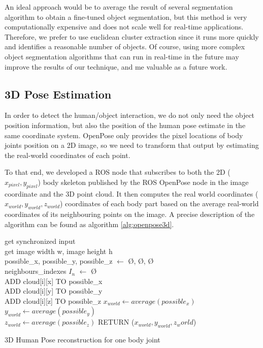 An ideal approach would be to average the result of several segmentation algorithm to obtain a fine-tuned object segmentation, but this method is very computationally expensive and does not scale well for real-time applications. Therefore, we prefer to use euclidean cluster extraction since it runs more quickly and identifies a reasonable number of objects. Of course, using more complex object segmentation algorithms that can run in real-time in the future may improve the results of our technique, and me valuable as a future work.

\subsection{3D Pose Estimation}
In order to detect the human/object interaction, we do not only need the object position information, but also the position of the human pose estimate in the same coordinate system. OpenPose only provides the pixel locations of body joints position on a 2D image, so we need to transform that output by estimating the real-world coordinates of each point.

To that end, we developed a ROS node that subscribes to both the 2D ($x_{pixel}, y_{pixel}$) body skeleton published by the ROS OpenPose node in the image coordinate and the 3D point cloud. It then computes the real world coordinates ($x_{world}, y_{world}, z_{world}$) coordinates of each body part based on the average real-world coordinates of its neighbouring points on the image. A precise description of the algorithm can be found as algorithm \ref{alg:openpose3d}.

\begin{algorithm}[htp]
    get synchronized input \\
    get image width w, image height h \\
    possible\_x, possible\_y, possible\_z $\leftarrow$ \O, \O, \O \\
    neighbours\_indexes $I_n$ $\leftarrow$ \O \\
    {
    {ADD cloud[i][x] TO possible\_x \\
    ADD cloud[i][y] TO possible\_y \\
    ADD cloud[i][z] TO possible\_z}
    $x_{world} \leftarrow average(possible_x)$ \\
    $y_{world} \leftarrow average(possible_y)$ \\
    $z_{world} \leftarrow average(possible_z)$}
    RETURN ($x_{world}, y_{world}, z_world$)
    \caption{3D Human Pose reconstruction for one body joint}
    \label{alg:openpose3d}
\end{algorithm}

